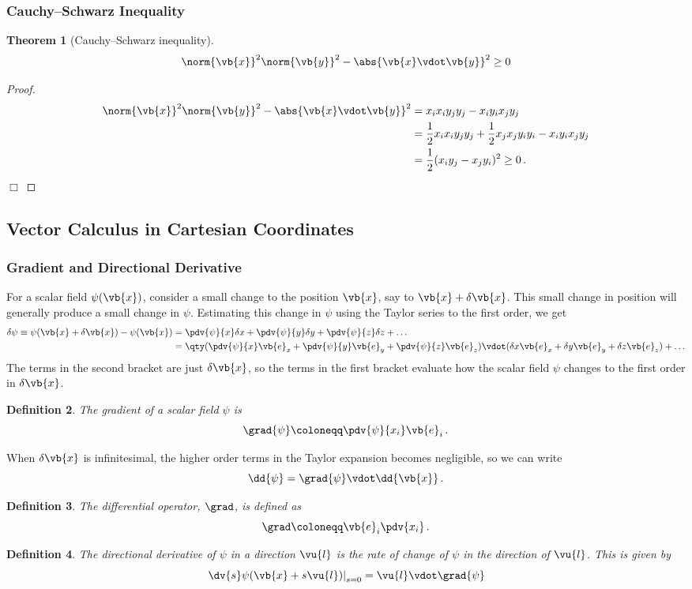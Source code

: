\documentclass{article}
\theoremstyle{plain}\theoremheaderfont{\normalfont\itshape}\theorembodyfont{\rmfamily}\theoremseparator{.}\newtheorem*{rem}{Remark}\newtheorem*{ex}{Example}\newtheorem*{proof}{Proof}\newtheorem*{altp}{Alternative proof}
\theoremstyle{plain}\theoremheaderfont{\normalfont\bfseries}\theorembodyfont{\rmfamily}\theoremseparator{.}\newtheorem{thm}{Theorem}[section]\newtheorem{lem}[thm]{Lemma}\newtheorem{prop}[thm]{Proposition}\newtheorem*{cor}{Corollary}\newtheorem{defn}[thm]{Definition}\newtheorem{clm}[thm]{Claim}\newtheorem{clminproof}{Claim}
\theoremstyle{break}\theoremheaderfont{\normalfont\itshape}\theorembodyfont{\rmfamily}\theoremseparator{.\medskip}\newtheorem*{proofskip}{Proof}\newtheorem*{exs}{Examples}\newtheorem*{rems}{Remarks}
\theoremstyle{break}\theoremheaderfont{\normalfont\bfseries}\theorembodyfont{\rmfamily}\theoremseparator{.\medskip}\newtheorem{lemskip}[thm]{Lemma}\newtheorem{defnskip}[thm]{Definition}\newtheorem{propskip}[thm]{Proposition}\newtheorem{thmskip}[thm]{Theorem}
\numberwithin{equation}{section}
\newcommand{\qed}{\hfill\ensuremath{\Box}}
\begin{document}
	\subsubsection{Cauchy--Schwarz Inequality}
	\begin{thm}[Cauchy--Schwarz inequality]
		\[\norm{\vb{x}}^2\norm{\vb{y}}^2-\abs{\vb{x}\vdot\vb{y}}^2\ge0\]
	\end{thm}
	
	\begin{proof}
		\begin{align*}
			\norm{\vb{x}}^2\norm{\vb{y}}^2-\abs{\vb{x}\vdot\vb{y}}^2&=x_ix_iy_jy_j-x_iy_ix_jy_j\\
			&=\frac{1}{2}x_ix_iy_jy_j+\frac{1}{2}x_jx_jy_iy_i-x_iy_ix_jy_j\\
			&=\frac{1}{2}(x_iy_j-x_jy_i)^2\ge0\,.
		\end{align*}
		\qed
	\end{proof}
	\subsection{Vector Calculus in Cartesian Coordinates}
	\subsubsection{Gradient and Directional Derivative}
	For a scalar field \(\psi(\vb{x})\), consider a small change to the position \(\vb{x}\), say to \(\vb{x}+\delta\vb{x}\). This small change in position will generally produce a small change in \(\psi\). Estimating this change in \(\psi\) using the Taylor series to the first order, we get
	\begin{align*}
		\delta\psi\equiv\psi(\vb{x}+\delta\vb{x})-\psi(\vb{x})&=\pdv{\psi}{x}\delta x+\pdv{\psi}{y}\delta y+\pdv{\psi}{z}\delta z+\dots\\
		&=\qty(\pdv{\psi}{x}\vb{e}_x+\pdv{\psi}{y}\vb{e}_y+\pdv{\psi}{z}\vb{e}_z)\vdot(\delta x\vb{e}_x+\delta y\vb{e}_y+\delta z\vb{e}_z)+\dots
	\end{align*}
	The terms in the second bracket are just \(\delta\vb{x}\), so the terms in the first bracket evaluate how the scalar field \(\psi\) changes to the first order in \(\delta\vb{x}\).
	\begin{defn}
		The \textit{gradient} of a scalar field \(\psi\) is
		\[\grad{\psi}\coloneqq\pdv{\psi}{x_i}\vb{e}_i\,.\]
	\end{defn}
	When \(\delta\vb{x}\) is infinitesimal, the higher order terms in the Taylor expansion becomes negligible, so we can write
	\[\dd{\psi}=\grad{\psi}\vdot\dd{\vb{x}}\,.\]
	\begin{defn}
		The \textit{differential operator}, \(\grad\), is defined as
		\[\grad\coloneqq\vb{e}_i\pdv{x_i}\,.\]
	\end{defn}
	\begin{defn}
		The \textit{directional derivative} of \(\psi\) in a direction \(\vu{l}\) is the rate of change of \(\psi\) in the direction of \(\vu{l}\). This is given by
		\[\left. \dv{s} \psi(\vb{x}+s\vu{l}) \right|_{s=0}=\vu{l}\vdot\grad{\psi}\]
	\end{defn}
	
\end{document}
